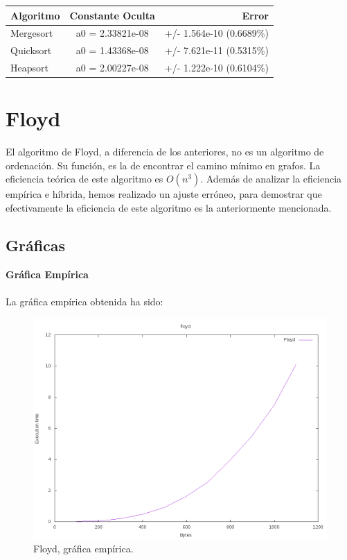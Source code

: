 \begin{center}
	\begin{tabular}{| l | c | r |}
		\hline
		\textbf{Algoritmo} & \textbf{Constante Oculta} & \textbf{Error} \\ \hline
		Mergesort & a0 = 2.33821e-08 & +/- 1.564e-10 (0.6689\%)\\ \hline
		Quicksort & a0 = 1.43368e-08 & +/- 7.621e-11 (0.5315\%) \\ \hline
		Heapsort & a0 = 2.00227e-08 & +/- 1.222e-10    (0.6104\%) \\ \hline
	\end{tabular}
\end{center}

\section{Floyd}

El algoritmo de Floyd, a diferencia de los anteriores, no es un algoritmo de ordenación. Su función, es la de encontrar el camino mínimo en grafos. La eficiencia teórica de este algoritmo es $O(n^3)$. Además de analizar la eficiencia empírica e híbrida, hemos realizado un ajuste erróneo, para demostrar que efectivamente la eficiencia de este algoritmo es la anteriormente mencionada.

\subsection{Gráficas}
\textbf{Gráfica Empírica}\\
\\
La gráfica empírica obtenida ha sido:
\begin{figure}[H]
	\centering
	\includegraphics[scale=0.5]{imagenes/floyd.png}
	\caption{Floyd, gráfica empírica.}
	\label{fig:E16}
\end{figure}



